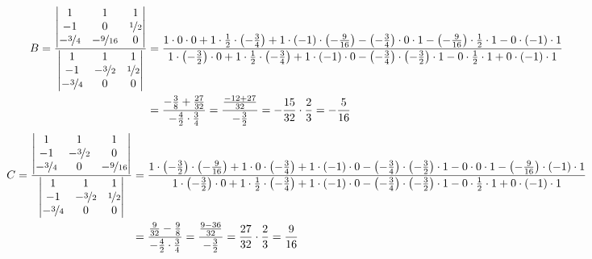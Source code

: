\documentclass[11pt,a4paper,DIV=12]{scrartcl}
\begin{document}
\begin{align}
	B=
	\frac{
		\begin{vmatrix}
			1 & 1 & 1 \\
			-1 & 0 & \nicefrac{1}{2} \\
			-\nicefrac{3}{4} & -\nicefrac{9}{16}&0
		\end{vmatrix}
	}
	{
		\begin{vmatrix}
			1 & 1 & 1 \\
			-1 & -\nicefrac{3}{2} & \nicefrac{1}{2} \\
			-\nicefrac{3}{4} & 0 & 0
		\end{vmatrix}
	}
	&=\frac
	{%
	1\cdot 0 \cdot 0 +
	1 \cdot \frac{1}{2} \cdot \left(-\frac{3}{4}\right) +
	1\cdot \left(-1\right) \cdot \left(-\frac{9}{16}\right) -
	\left(-\frac{3}{4}\right)\cdot 0 \cdot 1 -
	\left(-\frac{9}{16}\right)\cdot \frac{1}{2}\cdot 1 -
	0\cdot \left(-1\right)\cdot 1
	}
	{%
	1 \cdot \left(-\frac{3}{2}\right)\cdot 0 +
	1 \cdot \frac{1}{2}\cdot \left(-\frac{3}{4}\right) +
	1 \cdot \left(-1\right) \cdot 0 -
	\left(-\frac{3}{4}\right)\cdot \left(-\frac{3}{2}\right) \cdot 1 -
	0 \cdot \frac{1}{2}\cdot 1 +
	0 \cdot \left(-1\right) \cdot 1
	}\nonumber \\
	&=\frac{-\frac{3}{8}+\frac{27}{32}}{-\frac{4}{2}\cdot\frac{3}{4}}=\frac{\frac{-12+27}{32}}{-\frac{3}{2}}=-\frac{15}{32}\cdot\frac{2}{3}=-\frac{5}{16}
\end{align}
%
%
%
\begin{align}
	C=
	\frac{
		\begin{vmatrix}
			1 & 1 & 1 \\
			-1 & -\nicefrac{3}{2} & 0 \\
			-\nicefrac{3}{4}& 0 & -\nicefrac{9}{16}
		\end{vmatrix}
	}
	{
		\begin{vmatrix}
			1 & 1 & 1 \\
			-1 & -\nicefrac{3}{2} & \nicefrac{1}{2} \\
			-\nicefrac{3}{4} & 0 & 0
		\end{vmatrix}
	}
	&=\frac
	{%
	1 \cdot \left(-\frac{3}{2}\right) \cdot \left(-\frac{9}{16}\right) +
	1 \cdot 0 \cdot \left(-\frac{3}{4}\right) +
	1 \cdot \left(-1\right)\cdot 0 -
	\left(-\frac{3}{4}\right) \cdot \left(-\frac{3}{2}\right) \cdot 1 -
	0 \cdot 0 \cdot 1 -
	\left(-\frac{9}{16}\right) \cdot \left(-1\right)\cdot 1
	}
	{%
	1 \cdot \left(-\frac{3}{2}\right)\cdot 0 +
	1 \cdot \frac{1}{2} \cdot \left(-\frac{3}{4}\right) +
	1 \cdot \left(-1\right) \cdot 0 -
	\left(-\frac{3}{4}\right) \cdot \left(-\frac{3}{2}\right) \cdot 1 -
	0 \cdot \frac{1}{2} \cdot 1 +
	0 \cdot \left(-1\right) \cdot 1
	}\nonumber \\
	&=
	\frac{\frac{9}{32}-\frac{9}{8}}{-\frac{4}{2}\cdot\frac{3}{4}}=\frac{\frac{9-36}{32}}{-\frac{3}{2}}=\frac{27}{32}\cdot \frac{2}{3}=\frac{9}{16}
\end{align}
\end{document}
